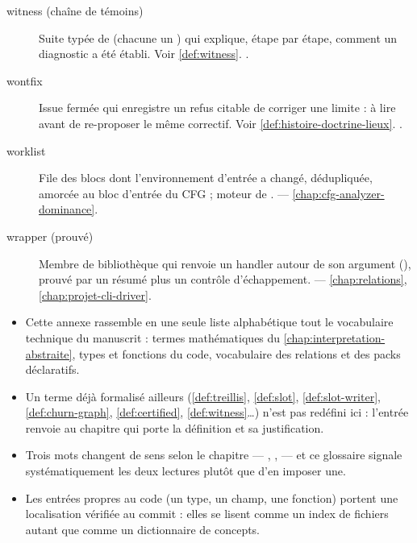 \begin{description}
\item[witness (chaîne de témoins)] Suite typée de  (chacune un ) qui explique, étape par étape, comment un diagnostic a été établi. Voir \cref{def:witness}. .

\item[wontfix] Issue fermée qui enregistre un refus citable de corriger une limite : à lire avant de re-proposer le même correctif. Voir \cref{def:histoire-doctrine-lieux}. .

\item[worklist] File des blocs dont l'environnement d'entrée a changé, dédupliquée, amorcée au bloc d'entrée du CFG ; moteur de .  — \cref{chap:cfg-analyzer-dominance}.

\item[wrapper (prouvé)] Membre de bibliothèque qui renvoie un handler autour de son argument (), prouvé par un résumé plus un contrôle d'échappement.  — \cref{chap:relations}, \cref{chap:projet-cli-driver}.

\end{description}

\begin{resume}
\begin{itemize}
  \item Cette annexe rassemble en une seule liste alphabétique tout le vocabulaire technique du manuscrit : termes mathématiques du \cref{chap:interpretation-abstraite}, types et fonctions du code, vocabulaire des relations et des packs déclaratifs.
  \item Un terme déjà formalisé ailleurs (\cref{def:treillis}, \cref{def:slot}, \cref{def:slot-writer}, \cref{def:churn-graph}, \cref{def:certified}, \cref{def:witness}\ldots) n'est pas redéfini ici : l'entrée renvoie au chapitre qui porte la définition et sa justification.
  \item Trois mots changent de sens selon le chapitre --- , ,  --- et ce glossaire signale systématiquement les deux lectures plutôt que d'en imposer une.
  \item Les entrées propres au code (un type, un champ, une fonction) portent une localisation vérifiée au commit \snapshotCommit{} : elles se lisent comme un index de fichiers autant que comme un dictionnaire de concepts.
\end{itemize}
\end{resume}

